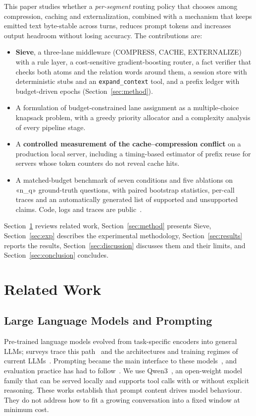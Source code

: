 \documentclass[journal]{IEEEtran}
\begin{document}
This paper studies whether a \emph{per-segment} routing policy that chooses among compression, caching and externalization,
combined with a mechanism that keeps emitted text byte-stable across turns, reduces prompt tokens and increases output headroom
without losing accuracy. The contributions are:
\begin{itemize}
\item \textbf{Sieve}, a three-lane middleware (COMPRESS, CACHE, EXTERNALIZE) with a rule layer, a cost-sensitive
gradient-boosting router, a fact verifier that checks both atoms and the relation words around them, a session store with
deterministic stubs and an \texttt{expand\_context} tool, and a prefix ledger with budget-driven epochs (Section~\ref{sec:method}).
\item A formulation of budget-constrained lane assignment as a multiple-choice knapsack problem, with a greedy priority allocator
and a complexity analysis of every pipeline stage.
\item A \textbf{controlled measurement of the cache--compression conflict} on a production local server, including a
timing-based estimator of prefix reuse for servers whose token counters do not reveal cache hits.
\item A matched-budget benchmark of seven conditions and five ablations on «n_q» ground-truth questions, with paired bootstrap
statistics, per-call traces and an automatically generated list of supported and unsupported claims. Code, logs and traces are
public~\cite{sieve2026code}.
\end{itemize}
Section~\ref{sec:related} reviews related work, Section~\ref{sec:method} presents Sieve, Section~\ref{sec:exp} describes the
experimental methodology, Section~\ref{sec:results} reports the results, Section~\ref{sec:discussion} discusses them and their
limits, and Section~\ref{sec:conclusion} concludes.

\section{Related Work}\label{sec:related}
\subsection{Large Language Models and Prompting}
Pre-trained language models evolved from task-specific encoders into general LLMs; surveys trace this
path~\cite{qiu2020ptm,han2021ptm,min2023recent} and the architectures and training regimes of current
LLMs~\cite{naveed2025overview,raiaan2024review,yang2024harnessing,lin2022transformers}. Prompting became the main interface to
these models~\cite{liu2023prompting,chen2025promptengineering}, and evaluation practice has had to follow~\cite{chang2024evaluation}.
We use Qwen3~\cite{qwen3}, an open-weight model family that can be served locally and supports tool calls with or without
explicit reasoning. These works establish that prompt content drives model behaviour. They do not address how to fit a growing
conversation into a fixed window at minimum cost.
\end{document}
